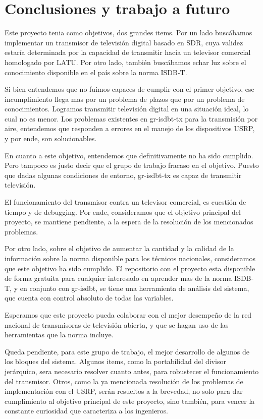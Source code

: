 \chapter{Conclusiones y trabajo a futuro}

Este proyecto tenia como objetivos, dos grandes items. Por un lado buscábamos implementar un transmisor de televisión digital basado en SDR, cuya validez estaría determinada por la capacidad de transmitir hacia un televisor comercial homologado por LATU. Por otro lado, también buscábamos echar luz sobre el conocimiento disponible en el país sobre la norma ISDB-T. 

Si bien entendemos que no fuimos capaces de cumplir con el primer objetivo, ese incumplimiento llega mas por un problema de plazos que por un problema de conocimientos. Logramos transmitir televisión digital en una situación ideal, lo cual no es menor. Los problemas existentes en gr-isdbt-tx para la transmisión por aire, entendemos que responden a errores en el manejo de los dispositivos USRP, y por ende, son solucionables.

En cuanto a este objetivo, entendemos que definitivamente no ha sido cumplido. Pero tampoco es justo decir que el grupo de trabajo fracaso en el objetivo. Puesto que dadas algunas condiciones de entorno, gr-isdbt-tx es capaz de transmitir televisión. 

El funcionamiento del transmisor contra un televisor comercial, es cuestión de tiempo y de debugging. Por ende, consideramos que el objetivo principal del proyecto, se mantiene pendiente, a la espera de la resolución de los mencionados problemas.

Por otro lado, sobre el objetivo de aumentar la cantidad y la calidad de la información sobre la norma disponible para los técnicos nacionales, consideramos que este objetivo ha sido cumplido. El repositorio con el proyecto esta disponible de forma gratuita para cualquier interesado en aprender mas de la norma ISDB-T, y en conjunto con gr-isdbt, se tiene una herramienta de análisis del sistema, que cuenta con control absoluto de todas las variables. 

Esperamos que este proyecto pueda colaborar con el mejor desempeño de la red nacional de transmisoras de televisión abierta, y que se hagan uso de las herramientas que la norma incluye. 

Queda pendiente, para este grupo de trabajo, el mejor desarrollo de algunos de los bloques del sistema. Algunos items, como la portabilidad del divisor jerárquico, sera necesario resolver cuanto antes, para robustecer el funcionamiento del transmisor. Otros, como la ya mencionada resolución de los problemas de implementación con el USRP, serán resueltos a la brevedad, no solo para dar cumplimiento al objetivo principal de este proyecto, sino también, para vencer la constante curiosidad que caracteriza a los ingenieros.

